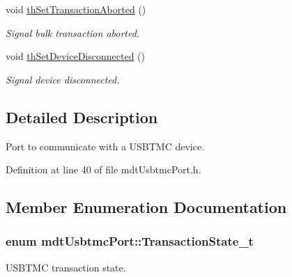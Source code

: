 \begin{DoxyCompactItemize}
void \hyperlink{classmdt_usbtmc_port_a1f864b8480f5953c0166478dd0f0c2c2}{th\-Set\-Transaction\-Aborted} ()
\begin{DoxyCompactList}\small\item\em Signal bulk transaction aborted. \end{DoxyCompactList}\item 
void \hyperlink{classmdt_usbtmc_port_a476cae8e5b124980ea2925e98fa70c68}{th\-Set\-Device\-Disconnected} ()
\begin{DoxyCompactList}\small\item\em Signal device disconnected. \end{DoxyCompactList}\end{DoxyCompactItemize}


\subsection{Detailed Description}
Port to communicate with a U\-S\-B\-T\-M\-C device. 

Definition at line 40 of file mdt\-Usbtmc\-Port.\-h.



\subsection{Member Enumeration Documentation}
\hypertarget{classmdt_usbtmc_port_a95543679f3981f4a061bb46731731868}{
\subsubsection[{Transaction\-State\-\_\-t}]{\setlength{\rightskip}{0pt plus 5cm}enum {\bf mdt\-Usbtmc\-Port\-::\-Transaction\-State\-\_\-t}\hspace{0.3cm}{\ttfamily [strong]}}}\label{classmdt_usbtmc_port_a95543679f3981f4a061bb46731731868}


U\-S\-B\-T\-M\-C transaction state. 

